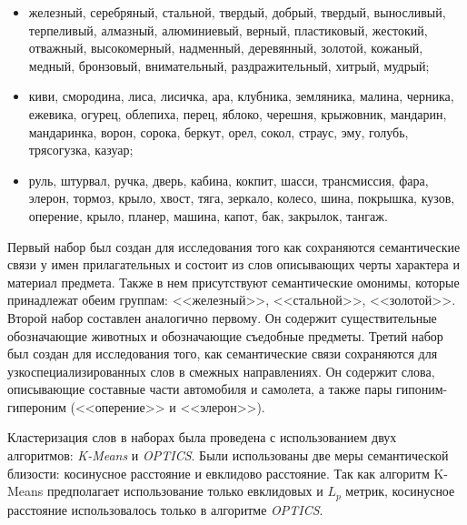 \documentclass[12pt, a4paper]{article}
\begin{document}
    \begin{itemize}
        \item железный, серебряный, стальной, твердый,
         добрый, твердый, выносливый, терпеливый,
         алмазный, алюминиевый, верный, пластиковый,
         жестокий, отважный, высокомерный, надменный,
         деревянный, золотой, кожаный, медный, 
         бронзовый, внимательный, раздражительный,
         хитрый, мудрый;
         
        \item киви, смородина, лиса, лисичка, 
         ара, клубника, земляника, малина, 
         черника, ежевика, огурец, облепиха, 
         перец, яблоко, черешня, крыжовник, 
         мандарин, мандаринка, ворон, сорока,
         беркут, орел, сокол, страус, эму,
         голубь, трясогузка, казуар;
         
        \item руль, штурвал, ручка, дверь, 
         кабина, кокпит, шасси, трансмиссия,
         фара, элерон, тормоз, крыло, 
         хвост, тяга, зеркало, колесо,
         шина, покрышка, кузов, оперение,
         крыло, планер, машина, капот, 
         бак, закрылок, тангаж.
    \end{itemize}

    Первый набор был создан для исследования того как сохраняются семантические связи у имен прилагательных и состоит из слов описывающих черты характера и материал предмета. Также в нем присутствуют семантические омонимы, которые принадлежат обеим группам: <<железный>>, <<стальной>>, <<золотой>>. Второй набор составлен аналогично первому. Он содержит существительные обозначающие животных и обозначающие съедобные предметы. Третий набор был создан для исследования того, как семантические связи сохраняются для узкоспециализированных слов в смежных направлениях. Он содержит слова, описывающие составные части автомобиля и самолета, а также пары гипоним-гипероним (<<оперение>> и <<элерон>>).

    Кластеризация слов в наборах была проведена с использованием двух алгоритмов: \textit{K-Means} и \textit{OPTICS}. Были использованы две меры семантической близости: косинусное расстояние и евклидово расстояние. Так как алгоритм K-Means предполагает использование только евклидовых и $L_p$ метрик, косинусное расстояние использовалось только в алгоритме \textit{OPTICS}.
\end{document}
